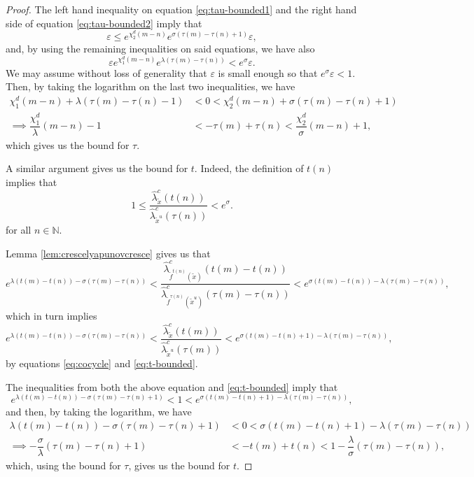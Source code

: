 \documentclass[a4paper,11pt,reqno]{amsart}
\newcommand{\eps}{\varepsilon}
\newcommand{\tix}{\tilde{x}}
\theoremstyle{definition}
\begin{document}
\begin{proof}
    The left hand inequality on equation \eqref{eq:tau-bounded1} and the right hand side of equation \eqref{eq:tau-bounded2} imply that
    $$\varepsilon \leq e^{\chi_2^d(m-n)} e^{\sigma(\tau(m) - \tau(n) + 1)} \varepsilon,$$
    and, by using the remaining inequalities on said equations, we have also
    $$\varepsilon e^{\chi_1^d(m-n)} e^{\lambda(\tau(m) - \tau(n))} < e^\sigma \varepsilon.$$
    We may assume without loss of generality that $\eps$ is small enough so that $e^{\sigma}\eps<1$. Then, by taking the logarithm on the last two inequalities, we have
    \begin{align*}
        \chi_1^d(m-n) + \lambda(\tau(m) - \tau(n) - 1) &< 0 <  \chi_2^d(m-n) + \sigma(\tau(m) - \tau(n) + 1)\\
        \implies \dfrac{\chi_1^d}{\lambda} (m-n) - 1 &< - \tau(m) + \tau(n) < \dfrac{\chi_2^d}{\sigma} (m-n) + 1,
    \end{align*}
    which gives us the bound for $\tau$.

    A similar argument gives us the bound for $t$. Indeed, the definition of $t(n)$ implies that
    \begin{equation}
        \label{eq:t-bounded}
        1 \leq \dfrac{\hat{\lambda}^c_{\tix}(t(n))}{\hat{\lambda}^c_{\tix^u}(\tau(n))} < e^\sigma.
    \end{equation}
    for all $n \in \mathbb{N}$.
    
    Lemma \ref{lem:crescelyapunovcresce} gives us that
    $$e^{\lambda (t(m) - t(n)) - \sigma (\tau(m) - \tau(n))} < \dfrac{\hat{\lambda}^c_{\tilde{f}^{t(n)}(\tix)}(t(m) - t(n))}{\hat{\lambda}^c_{\tilde{f}^{\tau(n)}(\tix^u)}(\tau(m) - \tau(n))} < e^{\sigma (t(m) - t(n)) - \lambda (\tau(m) - \tau(n))},$$
    which in turn implies
    $$e^{\lambda (t(m) - t(n)) - \sigma (\tau(m) - \tau(n))} < \dfrac{\hat{\lambda}^c_{\tix}(t(m))}{\hat{\lambda}^c_{\tix^u}(\tau(m))} < e^{\sigma (t(m) - t(n) + 1) - \lambda (\tau(m) - \tau(n))},$$
    by equations \eqref{eq:cocycle} and \eqref{eq:t-bounded}.

    The inequalities from both the above equation and \eqref{eq:t-bounded} imply that
    $$e^{\lambda (t(m) - t(n)) - \sigma (\tau(m) - \tau(n) + 1)} < 1 < e^{\sigma (t(m) - t(n) + 1) - \lambda (\tau(m) - \tau(n))},$$
    and then, by taking the logarithm, we have
    \begin{align*}
        \lambda (t(m) - t(n)) - \sigma (\tau(m) - \tau(n) + 1) &< 0 < \sigma (t(m) - t(n) + 1) - \lambda (\tau(m) - \tau(n))\\
        \implies - \dfrac{\sigma}{\lambda} (\tau(m) - \tau(n) + 1) &< - t(m) + t(n) <  1 - \dfrac{\lambda}{\sigma} (\tau(m) - \tau(n)),
    \end{align*}
    which, using the bound for $\tau$, gives us the bound for $t$.
\end{proof}
\end{document}
